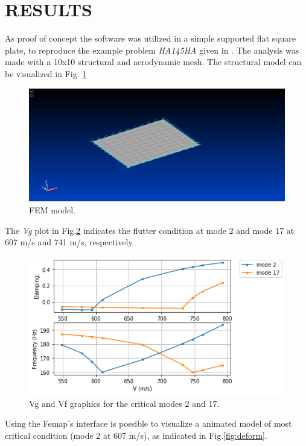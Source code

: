 
\section{RESULTS}

As proof of concept the software was utilized in a simple supported flat square plate, to reproduce the example problem \emph{HA145HA} given in \citet{siemens_nx_2014}.
The analysis was made with a 10x10 structural and aerodynamic mesh. The structural model can be visualized in Fig. \ref{fig:model}

\begin{figure}[h!]
    \centering
    \includegraphics[scale=0.5]{figures/undef-model.png}
    \caption{FEM model.}
    \label{fig:model}
\end{figure}

The \emph{Vg} plot in Fig.\ref{fig:plot} indicates the flutter condition at mode 2 and mode 17 at 607 m/s and 741 m/s, respectively.

\begin{figure}[ht]
    \centering
    \includegraphics[scale=0.8]{figures/vfvg.png}
    \caption{Vg and Vf graphics for the critical modes 2 and 17.}
    \label{fig:plot}
\end{figure}

Using the Femap's interface is possible to visualize a animated model of most critical condition (mode 2 at 607 m/s), as indicated in Fig.\ref{fig:deform}.

